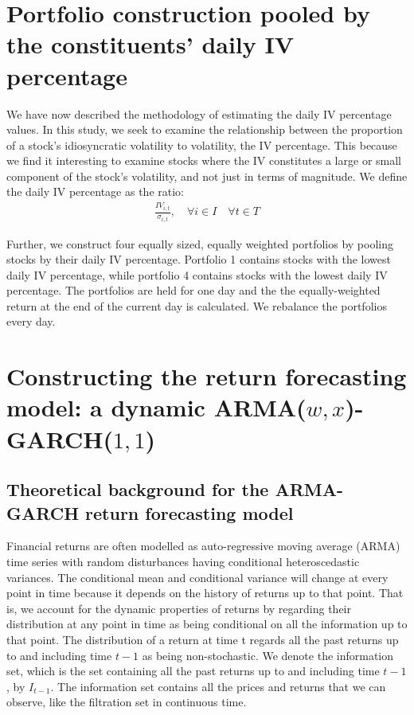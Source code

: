 \section{Portfolio construction pooled by the constituents' daily IV percentage}
We have now described the methodology of estimating the daily IV percentage values. In this study, we seek to examine the relationship between the proportion of a stock's idiosyncratic volatility to volatility, the IV percentage. This because we find it interesting to examine stocks where the IV constitutes a large or small component of the stock's volatility, and not just in terms of magnitude. We define the daily IV percentage as the ratio:
\begin{align}
    \frac{IV_{i,t}}{\sigma_{i,t}}, \quad  \forall i \in I \quad  \forall t \in T
\end{align}

Further, we construct four equally sized, equally weighted portfolios by pooling stocks by their daily IV percentage. Portfolio 1 contains stocks with the lowest daily IV percentage, while portfolio 4 contains stocks with the lowest daily IV percentage. The portfolios are held for one day and the the equally-weighted return at the end of the current day is calculated. We rebalance the portfolios every day. 


\section{Constructing the return forecasting model: a dynamic ARMA($w,x$)-GARCH($1,1$)} 


\subsection{Theoretical background for the ARMA-GARCH return forecasting model}

Financial returns are often modelled as auto-regressive moving average (ARMA) time series with random disturbances having conditional heteroscedastic variances. The conditional mean and conditional variance will change at every point in time because it depends on the history of returns up to that point. That is, we account for the dynamic properties of returns by regarding their distribution at any point in time as being conditional on all the information up to that point. The distribution of a return at time t regards all the past returns up to and including time $t-1$ as being non-stochastic. We denote the information set, which is the set containing all the past returns up to and including time $t-1$, by $I_{t-1}$. The information set contains all the prices and returns that we can observe, like the filtration set in continuous time. 

